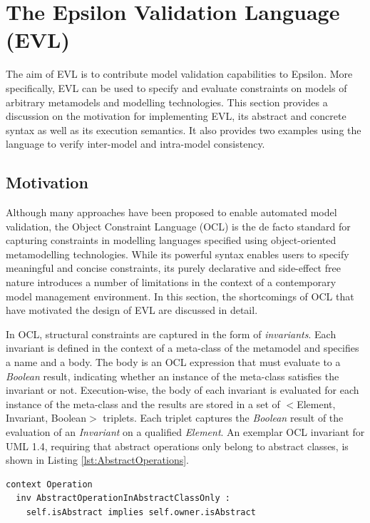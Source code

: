 \chapter{The Epsilon Validation Language (EVL)}
\label{sec:EVL}

The aim of EVL is to contribute model validation capabilities to Epsilon. More specifically, EVL can be used to specify and evaluate constraints on models of arbitrary metamodels and modelling technologies. This section provides a discussion on the motivation for implementing EVL, its abstract and concrete syntax as well as its execution semantics. It also provides two examples using the language to verify inter-model and intra-model consistency.

\section{Motivation}
\label{sec:OCL.Limitations}

Although many approaches have been proposed to enable automated model validation, the Object Constraint Language (OCL) \cite{OCL} is the de facto standard for capturing constraints in modelling languages specified using object-oriented metamodelling technologies. While its powerful syntax enables users to specify meaningful and concise constraints, its purely declarative and side-effect free nature introduces a number of limitations in the context of a contemporary model management environment. In this section, the shortcomings of OCL that have motivated the design of EVL are discussed in detail.

In OCL, structural constraints are captured in the form of \textit{invariants}. Each invariant is defined in the context of a meta-class of the metamodel and specifies a name and a body. The body is an OCL expression that must evaluate to a \emph{Boolean} result, indicating whether an instance of the meta-class satisfies the invariant or not. Execution-wise, the body of each invariant is evaluated for each instance of the meta-class and the results are stored in a set of $<$Element, Invariant, Boolean$>$ triplets. Each triplet captures the \emph{Boolean} result of the evaluation of an \emph{Invariant} on a qualified \emph{Element}. An exemplar OCL invariant for UML 1.4, requiring that abstract operations only belong to abstract classes, is shown in Listing \ref{lst:AbstractOperations}.

\begin{lstlisting}[caption=OCL constraint on UML operations, label=lst:AbstractOperations, language=OCL]
context Operation
  inv AbstractOperationInAbstractClassOnly :
    self.isAbstract implies self.owner.isAbstract
\end{lstlisting}

